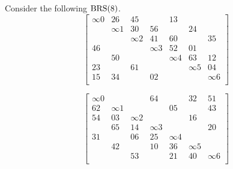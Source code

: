 \begin{example}
Consider the following $\operatorname{BRS}(8)$.
\begin{equation}
  \begin{bmatrix}
    \infty 0 &    26    &    45    &            &    13    &            &          \\
             & \infty 1 &    30    &     56     &          &     24     &          \\
             &          & \infty 2 &     41     &    60    &            &    35    \\
      46     &          &          &  \infty 3  &    52    &     01     &          \\
             &    50    &          &            & \infty 4 &     63     &    12    \\
      23     &          &    61    &            &          &  \infty 5  &    04    \\
      15     &    34    &          &     02     &          &            & \infty 6 \\
  \end{bmatrix}
\end{equation}

\begin{equation}
  \begin{bmatrix}
    \infty 0 &          &          &     64     &          &     32     &    51    \\
      62     & \infty 1 &          &            &    05    &            &    43    \\
      54     &    03    & \infty 2 &            &          &     16     &          \\
             &    65    &    14    &  \infty 3  &          &            &    20    \\
      31     &          &    06    &     25     & \infty 4 &            &          \\
             &    42    &          &     10     &    36    &  \infty 5  &          \\
             &          &    53    &            &    21    &     40     & \infty 6 \\
  \end{bmatrix}
\end{equation}


\end{example}
